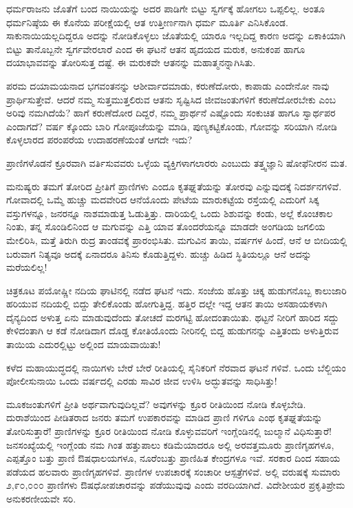 ಧರ್ಮರಾಜನು ಜೊತೆಗೆ ಬಂದ ನಾಯಿಯನ್ನು ಅದರ ಪಾಡಿಗೇ ಬಿಟ್ಟು ಸ್ವರ್ಗಕ್ಕೆ ಹೋಗಲು ಒಪ್ಪಲಿಲ್ಲ. ಅಂತೂ ಧರ್ಮನಿಷ್ಠೆಯ ಈ ಕೊನೆಯ ಪರೀಕ್ಷೆಯಲ್ಲಿ ಆತ ಉತ್ತೀರ್ಣನಾಗಿ ಧರ್ಮ ಮೂರ್ತಿ ಎನಿಸಿಕೊಂಡ. ಸಾಕುನಾಯಿಯಲ್ಲದಿದ್ದರೂ ಅದನ್ನು ನೋಡಿಕೊಳ್ಳಲು ಜೊತೆಯಲ್ಲಿ ಯಾರೂ ಇಲ್ಲದಿದ್ದ ಕಾರಣ ಅದನ್ನು ಏಕಾಕಿಯಾಗಿ ಬಿಟ್ಟು ತಾನೊಬ್ಬನೇ ಸ್ವರ್ಗವೇರಲಾರೆ ಎಂದ ಈ ಘಟನೆ ಆತನ ಹೃದಯದ ಮರುಕ, ಅನುಕಂಪ ಹಾಗೂ ದಯಾಭಾವವನ್ನು ತೋರಿಸುತ್ತ ದಷ್ಟೆ. ಈ ಮರುಕವೇ ಆತನನ್ನು ಮಹಾತ್ಮನನ್ನಾಗಿಸಿತು.

ಪರಮ ದಯಾಮಯನಾದ ಭಗವಂತನನ್ನು ಆಶೀರ್ವಾದಮಾಡು, ಕರುಣೆದೋರು, ಕಾಪಾಡು ಎಂದೇನೋ ನಾವು ಪ್ರಾರ್ಥಿಸುತ್ತೇವೆ. ಆದರೆ ನಮ್ಮ ಸುತ್ತಮುತ್ತಲಿರುವ ಆತನು ಸೃಷ್ಟಿಸಿದ ಜೀವಜಂತುಗಳಿಗೆ ಕರುಣೆದೋರಬೇಕು ಎಂಬ ಅರಿವು ನಮಗಿದೆಯೆ? ಹಾಗೆ ಕರುಣೆದೋರ ದಿದ್ದರೆ, ನಮ್ಮ ಪ್ರಾರ್ಥನೆ ಎಷ್ಟೊಂದು ಸಂಕುಚಿತ ಹಾಗೂ ಸ್ವಾರ್ಥಪರ ಎಂದಾಗದೆ? ವರ್ಷ ಕ್ಕೊಂದು ಬಾರಿ ಗೋಪೂಜೆಯನ್ನು ಮಾಡಿ, ಪುಣ್ಯಕಟ್ಟಿಕೊಂಡು, ಗೋವನ್ನು ಸರಿಯಾಗಿ ನೋಡಿ ಕೊಳ್ಳಲಾರದ ಪರಂಪರೆಯ ಉದಾಹರಣೆಯಂತೆ ಆಗದೇ ಇದು?

ಪ್ರಾಣಿಗಳೊಡನೆ ಕ್ರೂರವಾಗಿ ವರ್ತಿಸುವವರು ಒಳ್ಳೆಯ ವ್ಯಕ್ತಿಗಳಾಗಲಾರರು ಎಂಬುದು ತತ್ತ್ವಜ್ಞಾನಿ ಷೋಫೆನೀರನ ಮತ.

ಮನುಷ್ಯರು ತಮಗೆ ತೋರಿದ ಪ್ರೀತಿಗೆ ಪ್ರಾಣಿಗಳು ಎಂದೂ ಕೃತಘ್ನತೆಯನ್ನು ತೋರವು ಎನ್ನುವುದಕ್ಕೆ ನಿದರ್ಶನಗಳಿವೆ. ಗೋವಾದಲ್ಲಿ ಒಮ್ಮೆ ಹುಚ್ಚು ಮದವೇರಿದ ಆನೆಯೊಂದು ಪೇಟೆಯ ಮಾರುಕಟ್ಟೆಯ ರಸ್ತೆಯಲ್ಲಿ ಎದುರಿಗೆ ಸಿಕ್ಕ ವಸ್ತುಗಳನ್ನೂ, ಜನರನ್ನೂ ನಾಶಮಾಡುತ್ತ ಓಡುತ್ತಿತ್ತು. ದಾರಿಯಲ್ಲಿ ಒಂದು ಶಿಶುವನ್ನು ಕಂಡು, ಅಲ್ಲೆ ಕೊಂಚಕಾಲ ನಿಂತು, ತನ್ನ ಸೊಂಡಿಲಿನಿಂದ ಆ ಮಗುವನ್ನು ಎತ್ತಿ ಯಾವ ತೊಂದರೆಯನ್ನೂ ಮಾಡದೇ ಅಂಗಡಿಯ ಜಗಲಿಯ ಮೇಲಿರಿಸಿ, ಮತ್ತೆ ತಿರುಗಿ ರುದ್ರ ತಾಂಡವಕ್ಕೆ ಪ್ರಾರಂಭಿಸಿತು. ಮಗುವಿನ ತಾಯಿ, ವರ್ಷಗಳ ಹಿಂದೆ, ಆನೆ ಆ ಬೀದಿಯಲ್ಲಿ ಬರುವಾಗ ನಿತ್ಯವೂ ಅದಕ್ಕೆ ಏನಾದರೂ ತಿನಿಸು ಕೊಡುತ್ತಿದ್ದಳು. ಹುಚ್ಚು ಹಿಡಿದ ಸ್ಥಿತಿಯಲ್ಲೂ ಆನೆ ಅದನ್ನು ಮರೆಯಲಿಲ್ಲ!

ಚಿತ್ರಕೂಟ ಪಯೋಷ್ಣೀ ನದಿಯ ಘಾಟಿನಲ್ಲಿ ನಡೆದ ಘಟನೆ ಇದು. ಸಂಜೆಯ ಹೊತ್ತು ಚಿಕ್ಕ ಹುಡುಗನೊಬ್ಬ ಕಾಲುಜಾರಿ ಹರಿಯುವ ನದಿಯಲ್ಲಿ ಬಿದ್ದು ತೇಲಿಕೊಂಡು ಹೋಗುತ್ತಿದ್ದ. ಹತ್ತಿರ ದಲ್ಲೇ ಇದ್ದ ಆತನ ತಾಯಿ ಅಸಹಾಯಕಳಾಗಿ ದೈನ್ಯದಿಂದ ಅಳುತ್ತ ಏನು ಮಾಡುವುದೆಂದು ತೋಚದೆ ಮರಗಟ್ಟಿ ಹೋದಂತಾಯಿತು. ಥಟ್ಟನೆ ನೀರಿಗೆ ಹಾರಿದ ಸದ್ದು ಕೇಳಿದಂತಾಗಿ ಆ ಕಡೆ ನೋಡಿದಾಗ ದೊಡ್ಡ ಕೋತಿಯೊಂದು ನೀರಿನಲ್ಲಿ ಬಿದ್ದ ಹುಡುಗನನ್ನು ಎತ್ತಿತಂದು ಅಳುತ್ತಿರುವ ತಾಯಿಯ ಎದುರಲ್ಲಿಟ್ಟು ಅಲ್ಲಿಂದ ಮಾಯವಾಯಿತು!

ಕಳೆದ ಮಹಾಯುದ್ಧದಲ್ಲಿ ನಾಯಿಗಳು ಬೇರೆ ಬೇರೆ ರೀತಿಯಲ್ಲಿ ಸೈನಿಕರಿಗೆ ನೆರವಾದ ಘಟನೆ ಗಳಿವೆ. ಒಂದು ಬೆಲ್ಜಿಯಂ ಪೋಲೀಸುನಾಯಿ ಒಂದು ವರ್ಷದಲ್ಲಿ ಎರಡು ಸಾವಿರ ಜೀವ ಉಳಿಸಿ ಅದ್ಭುತವನ್ನು ಸಾಧಿಸಿತ್ತು!

ಮೂಕಜಂತುಗಳಿಗೆ ಪ್ರೀತಿ ಅರ್ಥವಾಗುವುದಿಲ್ಲವೆ? ಅವುಗಳನ್ನು ಕ್ರೂರ ರೀತಿಯಿಂದ ನೋಡಿ ಕೊಳ್ಳಬೇಡಿ. ದುರಾಶೆಯಿಂದ ಪೀಡಿತರಾದ ಜನರು ತಮಗೆ ಉಪಕಾರವನ್ನು ಮಾಡಿದ ಪ್ರಾಣಿ ಗಳಿಗೂ ಎಂಥ ಕೃತಘ್ನತೆಯನ್ನು ತೋರಿಸುತ್ತಾರೆ! ಪ್ರಾಣಿಗಳನ್ನು ಕ್ರೂರ ರೀತಿಯಿಂದ ನೋಡಿ ಕೊಳ್ಳುವವರಿಗೆ ಇಂಗ್ಲೆಂಡಿನಲ್ಲಿ ಜುಲ್ಮಾನೆ ವಿಧಿಸುತ್ತಾರೆ! ಜನಸಂಖ್ಯೆಯಲ್ಲಿ ಇಂಗ್ಲೆಂಡು ನಮ ಗಿಂತ ಹತ್ತುಪಾಲು ಕಡಿಮೆಯಾದರೂ ಅಲ್ಲಿ ಅರವತ್ತಮೂರು ಪ್ರಾಣಿಗೃಹಗಳೂ, ಎಪ್ಪತ್ತೊಂ ಬತ್ತು ಪ್ರಾಣಿ ಔಷಧಾಲಯಗಳೂ, ನೂರೆಂಬತ್ತು ಪ್ರಾಣಿಹಿತ ಕೇಂದ್ರಗಳೂ ಇವೆ. ಸರಕಾರ ದಿಂದ ಸಹಾಯ ಪಡೆಯದ ಹಲವಾರು ಪ್ರಾಣಿಗೃಹಗಳಿವೆ. ಪ್ರಾಣಿಗಳ ಉಪಚಾರಕ್ಕೆ ಸಂಚಾರೀ ಆಸ್ಪತ್ರೆಗಳಿವೆ. ಅಲ್ಲಿ ವರುಷಕ್ಕೆ ಸುಮಾರು ೨,೯೦,೦೦೦ ಪ್ರಾಣಿಗಳು ಔಷಧೋಪಚಾರವನ್ನು ಪಡೆಯುವುವು ಎಂದು ವರದಿಯಾಗಿದೆ. ವಿದೇಶೀಯರ ಪ್ರಕೃತಿಪ್ರೇಮ ಅನುಕರಣೀಯವೇ ಸರಿ.

